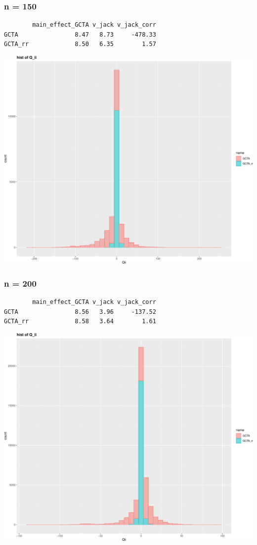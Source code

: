 \documentclass[]{article}
\begin{document}
\subsubsection{n = 150}\label{n-150}

\begin{verbatim}
        main_effect_GCTA v_jack v_jack_corr
GCTA                8.47   8.73     -478.33
GCTA_rr             8.50   6.35        1.57
\end{verbatim}

\includegraphics{GCTA_and_rr_v_jack_correction_files/figure-latex/unnamed-chunk-5-1.pdf}
\newpage

\subsubsection{n = 200}\label{n-200}

\begin{verbatim}
        main_effect_GCTA v_jack v_jack_corr
GCTA                8.56   3.96     -137.52
GCTA_rr             8.58   3.64        1.61
\end{verbatim}

\includegraphics{GCTA_and_rr_v_jack_correction_files/figure-latex/unnamed-chunk-6-1.pdf}
\end{document}
